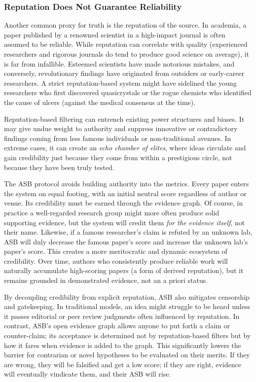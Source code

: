 \documentclass{article}
\begin{document}
\subsubsection{Reputation Does Not Guarantee Reliability}
Another common proxy for truth is the reputation of the source. In academia, a paper published by a renowned scientist in a high-impact journal is often assumed to be reliable. While reputation can correlate with quality (experienced researchers and rigorous journals do tend to produce good science on average), it is far from infallible. Esteemed scientists have made notorious mistakes, and conversely, revolutionary findings have originated from outsiders or early-career researchers. A strict reputation-based system might have sidelined the young researchers who first discovered quasicrystals or the rogue chemists who identified the cause of ulcers (against the medical consensus at the time).

Reputation-based filtering can entrench existing power structures and biases. It may give undue weight to authority and suppress innovative or contradictory findings coming from less famous individuals or non-traditional avenues. In extreme cases, it can create an \emph{echo chamber of elites}, where ideas circulate and gain credibility just because they come from within a prestigious circle, not because they have been truly tested.

The ASB protocol avoids building authority into the metrics. Every paper enters the system on equal footing, with an initial neutral score regardless of author or venue. Its credibility must be earned through the evidence graph. Of course, in practice a well-regarded research group might more often produce solid supporting evidence, but the system will credit them \emph{for the evidence itself}, not their name. Likewise, if a famous researcher's claim is refuted by an unknown lab, ASB will duly decrease the famous paper's score and increase the unknown lab's paper's score. This creates a more meritocratic and dynamic ecosystem of credibility. Over time, authors who consistently produce reliable work will naturally accumulate high-scoring papers (a form of derived reputation), but it remains grounded in demonstrated evidence, not an a priori status.

By decoupling credibility from explicit reputation, ASB also mitigates censorship and gatekeeping. In traditional models, an idea might struggle to be heard unless it passes editorial or peer review judgments often influenced by reputation. In contrast, ASB's open evidence graph allows anyone to put forth a claim or counter-claim; its acceptance is determined not by reputation-based filters but by how it fares when evidence is added to the graph. This significantly lowers the barrier for contrarian or novel hypotheses to be evaluated on their merits. If they are wrong, they will be falsified and get a low score; if they are right, evidence will eventually vindicate them, and their ASB will rise.
\end{document}
